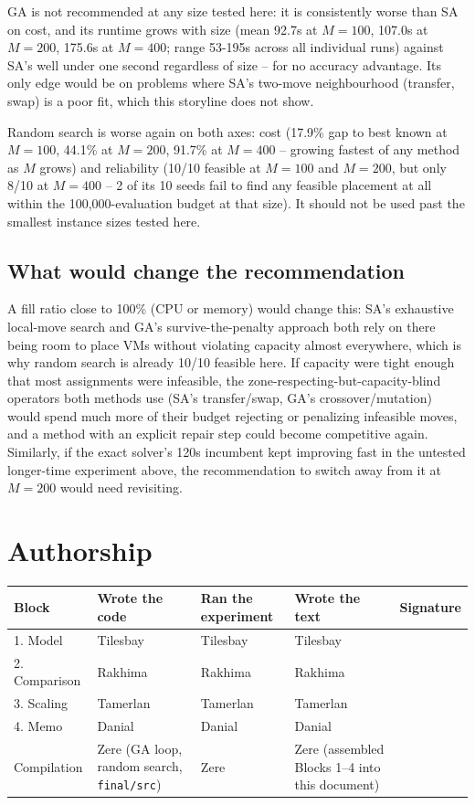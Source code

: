 \documentclass[11pt,a4paper]{article}
\begin{document}
GA is not recommended at any size tested here: it is consistently worse than SA on cost, and its runtime grows with size (mean 92.7s at $M{=}100$, 107.0s at $M{=}200$, 175.6s at $M{=}400$; range 53-195s across all individual runs) against SA's well under one second regardless of size -- for no accuracy advantage. Its only edge would be on problems where SA's two-move neighbourhood (transfer, swap) is a poor fit, which this storyline does not show.

Random search is worse again on both axes: cost (17.9\% gap to best known at $M{=}100$, 44.1\% at $M{=}200$, 91.7\% at $M{=}400$ -- growing fastest of any method as $M$ grows) and reliability (10/10 feasible at $M{=}100$ and $M{=}200$, but only 8/10 at $M{=}400$ -- 2 of its 10 seeds fail to find any feasible placement at all within the 100{,}000-evaluation budget at that size). It should not be used past the smallest instance sizes tested here.

\subsection*{What would change the recommendation}
A fill ratio close to 100\% (CPU or memory) would change this: SA's exhaustive local-move search and GA's survive-the-penalty approach both rely on there being room to place VMs without violating capacity almost everywhere, which is why random search is already 10/10 feasible here. If capacity were tight enough that most assignments were infeasible, the zone-respecting-but-capacity-blind operators both methods use (SA's transfer/swap, GA's crossover/mutation) would spend much more of their budget rejecting or penalizing infeasible moves, and a method with an explicit repair step could become competitive again. Similarly, if the exact solver's 120s incumbent kept improving fast in the untested longer-time experiment above, the recommendation to switch away from it at $M{=}200$ would need revisiting.

\appendix
\section{Authorship}
\begin{tabularx}{\textwidth}{@{}XXXXl@{}}
\toprule
Block & Wrote the code & Ran the experiment & Wrote the text & Signature\\
\midrule
1. Model & Tilesbay & Tilesbay & Tilesbay & \\
2. Comparison & Rakhima & Rakhima & Rakhima & \\
3. Scaling & Tamerlan & Tamerlan & Tamerlan & \\
4. Memo & Danial & Danial & Danial & \\
Compilation & Zere (GA loop, random search, \texttt{final/src}) & Zere & Zere (assembled Blocks 1--4 into this document) & \\
\bottomrule
\end{tabularx}
\end{document}
